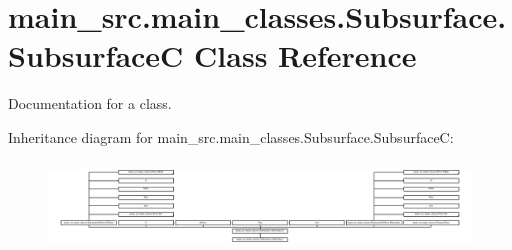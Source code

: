 \hypertarget{classmain__src_1_1main__classes_1_1Subsurface_1_1SubsurfaceC}{\section{main\-\_\-src.\-main\-\_\-classes.\-Subsurface.\-Subsurface\-C Class Reference}
\label{classmain__src_1_1main__classes_1_1Subsurface_1_1SubsurfaceC}
}


Documentation for a class.  


Inheritance diagram for main\-\_\-src.\-main\-\_\-classes.\-Subsurface.\-Subsurface\-C\-:\begin{figure}[H]
\begin{center}
\leavevmode
\includegraphics[height=2.352941cm]{classmain__src_1_1main__classes_1_1Subsurface_1_1SubsurfaceC}
\end{center}
\end{figure}
